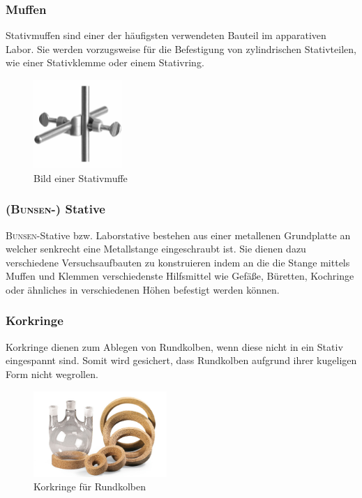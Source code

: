 \subsubsection{Muffen}
Stativmuffen sind einer der häufigsten verwendeten Bauteil im apparativen Labor. Sie werden vorzugsweise für die Befestigung von zylindrischen Stativteilen, wie einer Stativklemme oder einem Stativring.
\vspace*{-5mm}
\begin{figure}[h!]
	\centering
	\includegraphics[width=0.3\textwidth]{img/muffe}
	\caption{Bild einer Stativmuffe}
	\label{fig:muffe}
\end{figure}
\FloatBarrier
\vspace*{-2mm}
\subsubsection{(\textsc{Bunsen}-) Stative}
\textsc{Bunsen}-Stative bzw. Laborstative bestehen aus einer metallenen Grundplatte an welcher senkrecht eine Metallstange eingeschraubt ist. Sie dienen dazu verschiedene Versuchsaufbauten zu konstruieren indem an die die Stange mittels Muffen und Klemmen verschiedenste Hilfsmittel wie Gefäße, Büretten, Kochringe oder ähnliches in verschiedenen Höhen befestigt werden können.

\subsubsection{Korkringe}
Korkringe dienen zum Ablegen von Rundkolben, wenn diese nicht in ein Stativ eingespannt sind. Somit wird gesichert, dass Rundkolben aufgrund ihrer kugeligen Form nicht wegrollen.
\begin{figure}[h!]
	\centering
	\includegraphics[width=0.45\textwidth]{img/korkring}
	\caption{Korkringe für Rundkolben}
	\label{fig:korkring}
\end{figure}
\FloatBarrier

